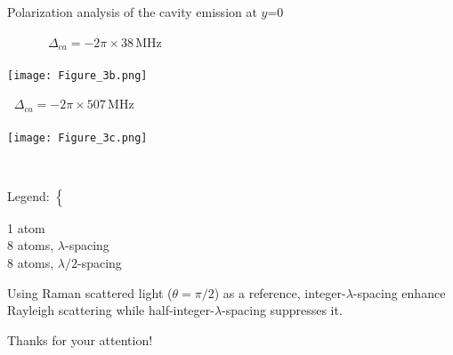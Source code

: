 \documentclass{beamer}
\begin{document}
\begin{frame}{Polarization analysis of the cavity emission {\tiny at $y$=0}}
	\begin{minipage}{0.49\textwidth}
		\centering
		$\quad\qquad\;\Delta_{ca}=-2\pi\times38\,$MHz\\~\\
		\vspace{-0.8em}
		\texttt{[image: Figure\_3b.png]}
	\end{minipage}
	\hfill
	\begin{minipage}{0.49\textwidth}
		\centering
		$\;\;\Delta_{ca}=-2\pi\times507\,$MHz\\~\\
		\vspace{-0.8em}
		\texttt{[image: Figure\_3c.png]}
	\end{minipage}\\
	\vspace{2em}
	\begin{minipage}{0.2\textwidth}
		\vfill
		\begin{minipage}\textwidth
			Legend: $\begin{cases}
			~\\
			~\\
			~
			\end{cases}$
		\end{minipage}
		\vfill
	\end{minipage}
	\hspace{-2em}
	\begin{minipage}{0.33\textwidth}
		\textcolor[rgb]{0.376, 0.376, 0.376}{1 atom}\\
		\textcolor[rgb]{0.263, 0.588, 0.588}{8 atoms, $\lambda$-spacing}\\
		\textcolor[rgb]{0.553, 0.231, 0.376}{8 atoms, $\lambda/2$-spacing}
	\end{minipage}
	\hspace{-0.2em}
	\begin{minipage}{0.47\textwidth}
		{\footnotesize Using Raman scattered light ($\theta=\pi/2$) as a reference, integer-$\lambda$-spacing enhance Rayleigh scattering while half-integer-$\lambda$-spacing suppresses it.}
	\end{minipage}
\end{frame}

\begin{frame}{}
	\centering
	{\LARGE Thanks for your attention!}
\end{frame}
\end{document}
